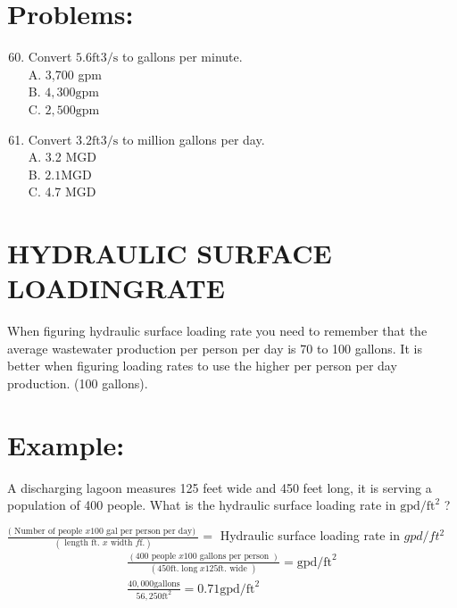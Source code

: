 \documentclass[10pt]{article}
\begin{document}
\section{Problems:}
\begin{enumerate}
  \setcounter{enumi}{59}
  \item Convert $5.6 \mathrm{ft} 3 / \mathrm{s}$ to gallons per minute.\\
A. 3,700 gpm\\
B. $4,300 \mathrm{gpm}$\\
C. $2,500 \mathrm{gpm}$

  \item Convert $3.2 \mathrm{ft} 3 / \mathrm{s}$ to million gallons per day.\\
A. 3.2 MGD\\
B. $2.1 \mathrm{MGD}$\\
C. 4.7 MGD

\end{enumerate}
\section{HYDRAULIC SURFACE LOADINGRATE}
When figuring hydraulic surface loading rate you need to remember that the average wastewater production per person per day is 70 to 100 gallons. It is better when figuring loading rates to use the higher per person per day production. (100 gallons).

\section{Example:}
A discharging lagoon measures 125 feet wide and 450 feet long, it is serving a population of 400 people. What is the hydraulic surface loading rate in $\mathrm{gpd} / \mathrm{ft}^{2}$ ?

$\frac{(\text { Number of people } x 100 \text { gal per person per day) }}{(\text { length ft. } x \text { width } f \mathrm{f} .)}=$ Hydraulic surface loading rate in $g p d / f t^{2}$
$$
\begin{gathered}
\frac{(400 \text { people } x 100 \text { gallons per person })}{(450 \mathrm{ft} . \operatorname{long} x 125 \mathrm{ft} . \text { wide })}=\mathrm{gpd} / \mathrm{ft}^{2} \\
\frac{40,000 \mathrm{gallons}}{56,250 \mathrm{ft}^{2}}=0.71 \mathrm{gpd} / \mathrm{ft}^{2}
\end{gathered}
$$
\end{document}
